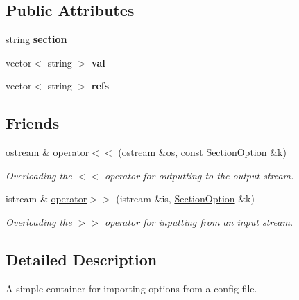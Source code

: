 \subsection*{Public Attributes}
\begin{DoxyCompactItemize}
\item 
string {\bfseries section}\hypertarget{struct_section_option_af6dd28af164466810fe9f36091b9d6d1}{}\label{struct_section_option_af6dd28af164466810fe9f36091b9d6d1}

\item 
vector$<$ string $>$ {\bfseries val}\hypertarget{struct_section_option_a789da4aa7aeef3887bcfc94f7cf2c254}{}\label{struct_section_option_a789da4aa7aeef3887bcfc94f7cf2c254}

\item 
vector$<$ string $>$ {\bfseries refs}\hypertarget{struct_section_option_a916b36005e0e1817a9dcf45bf02952e4}{}\label{struct_section_option_a916b36005e0e1817a9dcf45bf02952e4}

\end{DoxyCompactItemize}
\subsection*{Friends}
\begin{DoxyCompactItemize}
\item 
ostream \& \hyperlink{struct_section_option_a8e9eafe82f001a7bf599bebb1f0bdb76}{operator$<$$<$} (ostream \&os, const \hyperlink{struct_section_option}{Section\+Option} \&k)
\begin{DoxyCompactList}\small\item\em Overloading the $<$$<$ operator for outputting to the output stream. \end{DoxyCompactList}\item 
istream \& \hyperlink{struct_section_option_a6e317b3e4692b867e48205afcceff1a1}{operator$>$$>$} (istream \&is, \hyperlink{struct_section_option}{Section\+Option} \&k)
\begin{DoxyCompactList}\small\item\em Overloading the $>$$>$ operator for inputting from an input stream. \end{DoxyCompactList}\end{DoxyCompactItemize}


\subsection{Detailed Description}
A simple container for importing options from a config file. 

